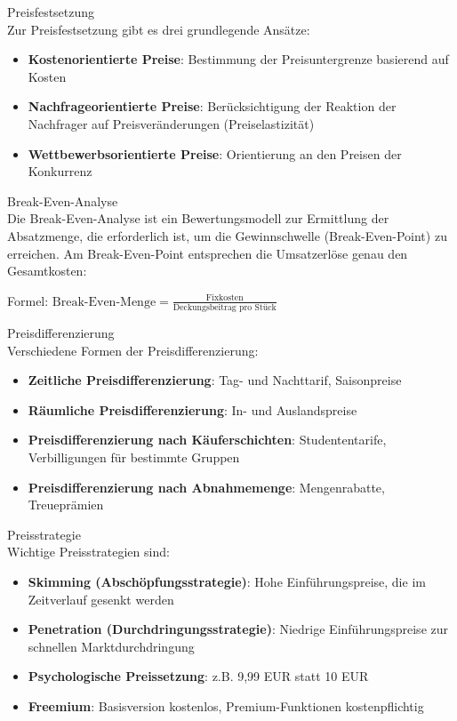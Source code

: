 \begin{definition}{Preisfestsetzung}\\
Zur Preisfestsetzung gibt es drei grundlegende Ansätze:
\begin{itemize}
    \item \textbf{Kostenorientierte Preise}: Bestimmung der Preisuntergrenze basierend auf Kosten
    \item \textbf{Nachfrageorientierte Preise}: Berücksichtigung der Reaktion der Nachfrager auf Preisveränderungen (Preiselastizität)
    \item \textbf{Wettbewerbsorientierte Preise}: Orientierung an den Preisen der Konkurrenz
\end{itemize}
\end{definition}

\begin{concept}{Break-Even-Analyse}\\
Die Break-Even-Analyse ist ein Bewertungsmodell zur Ermittlung der Absatzmenge, die erforderlich ist, um die Gewinnschwelle (Break-Even-Point) zu erreichen. Am Break-Even-Point entsprechen die Umsatzerlöse genau den Gesamtkosten:

Formel: $\text{Break-Even-Menge} = \frac{\text{Fixkosten}}{\text{Deckungsbeitrag pro Stück}}$
\end{concept}

\begin{definition}{Preisdifferenzierung}\\
Verschiedene Formen der Preisdifferenzierung:
\begin{itemize}
    \item \textbf{Zeitliche Preisdifferenzierung}: Tag- und Nachttarif, Saisonpreise
    \item \textbf{Räumliche Preisdifferenzierung}: In- und Auslandspreise
    \item \textbf{Preisdifferenzierung nach Käuferschichten}: Studententarife, Verbilligungen für bestimmte Gruppen
    \item \textbf{Preisdifferenzierung nach Abnahmemenge}: Mengenrabatte, Treueprämien
\end{itemize}
\end{definition}

\begin{definition}{Preisstrategie}\\
Wichtige Preisstrategien sind:
\begin{itemize}
    \item \textbf{Skimming (Abschöpfungsstrategie)}: Hohe Einführungspreise, die im Zeitverlauf gesenkt werden
    \item \textbf{Penetration (Durchdringungsstrategie)}: Niedrige Einführungspreise zur schnellen Marktdurchdringung
    \item \textbf{Psychologische Preissetzung}: z.B. 9,99 EUR statt 10 EUR
    \item \textbf{Freemium}: Basisversion kostenlos, Premium-Funktionen kostenpflichtig
\end{itemize}
\end{definition}

